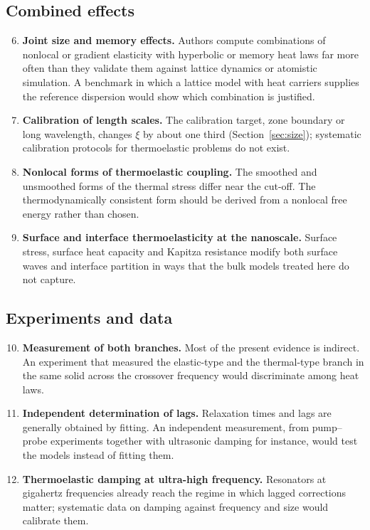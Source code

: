 \subsection{Combined effects}
\begin{enumerate}
\setcounter{enumi}{5}
\item \textbf{Joint size and memory effects.} Authors compute combinations of nonlocal or gradient elasticity with hyperbolic or memory heat laws far more often than they validate them against lattice dynamics or atomistic simulation. A benchmark in which a lattice model with heat carriers supplies the reference dispersion would show which combination is justified.
\item \textbf{Calibration of length scales.} The calibration target, zone boundary or long wavelength, changes $\xi$ by about one third (Section~\ref{sec:size}); systematic calibration protocols for thermoelastic problems do not exist.
\item \textbf{Nonlocal forms of thermoelastic coupling.} The smoothed and unsmoothed forms of the thermal stress differ near the cut-off. The thermodynamically consistent form should be derived from a nonlocal free energy rather than chosen.
\item \textbf{Surface and interface thermoelasticity at the nanoscale.} Surface stress, surface heat capacity and Kapitza resistance modify both surface waves and interface partition in ways that the bulk models treated here do not capture.
\end{enumerate}
\subsection{Experiments and data}
\begin{enumerate}
\setcounter{enumi}{9}
\item \textbf{Measurement of both branches.} Most of the present evidence is indirect. An experiment that measured the elastic-type and the thermal-type branch in the same solid across the crossover frequency would discriminate among heat laws.
\item \textbf{Independent determination of lags.} Relaxation times and lags are generally obtained by fitting. An independent measurement, from pump--probe experiments together with ultrasonic damping for instance, would test the models instead of fitting them.
\item \textbf{Thermoelastic damping at ultra-high frequency.} Resonators at gigahertz frequencies already reach the regime in which lagged corrections matter; systematic data on damping against frequency and size would calibrate them.
\end{enumerate}
